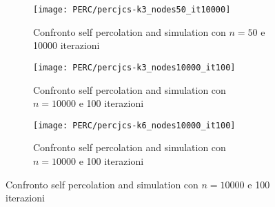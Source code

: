    \begin{figure}[H]
        \begin{minipage}{\linewidth}
            \centering
            \begin{minipage}{0.45\linewidth}
                \begin{figure}
                    \texttt{[image: PERC/percjcs-k3\_nodes50\_it10000]}\caption{Confronto self percolation and simulation con $n=50$ e 10000 iterazioni}
                    \label{fig:perc_jcs_k_3_nodes_50}
                \end{figure}
            \end{minipage}
            \hspace{0.05\linewidth}
            \begin{minipage}{0.45\linewidth}
                \begin{figure}
                    \texttt{[image: PERC/percjcs-k3\_nodes10000\_it100]}\caption{Confronto self percolation and simulation con $n=10000$ e 100 iterazioni}
                    \label{fig:perc_jcs_k_3_nodes_10000}
                \end{figure}
            \end{minipage}
            \begin{minipage}{0.45\linewidth}
                \begin{figure}
                    \texttt{[image: PERC/percjcs-k6\_nodes10000\_it100]}\caption{Confronto self percolation and simulation con $n=10000$ e 100 iterazioni}
                    \label{fig:perc_jcs_k_6_nodes_10000}
                \end{figure}
            \end{minipage}
            \caption{Confronto self percolation and simulation con $n=10000$ e 100 iterazioni}
        \end{minipage}
    \end{figure}


